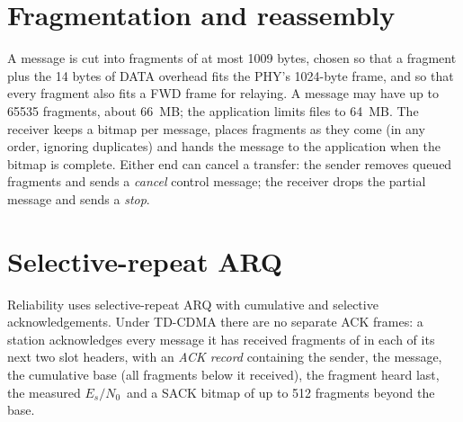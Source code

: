 \documentclass[11pt,a4paper,oneside]{report}
\newcommand{\EsNo}{\ensuremath{E_s/N_0}}
\begin{document}
\section{Fragmentation and reassembly}\label{sec:frag}
A message is cut into fragments of at most \num{1009} bytes, chosen so that a fragment plus the 14
bytes of DATA overhead fits the PHY's \num{1024}-byte frame, and so that every fragment also fits a FWD
frame for relaying. A message may have up to \num{65535} fragments, about \SI{66}{MB}; the application
limits files to \SI{64}{MB}. The receiver keeps a bitmap per message, places fragments as they come
(in any order, ignoring duplicates) and hands the message to the application when the bitmap is
complete. Either end can cancel a transfer: the sender removes queued fragments and sends a
\emph{cancel} control message; the receiver drops the partial message and sends a \emph{stop}.

\section{Selective-repeat ARQ}\label{sec:arq}
Reliability uses selective-repeat ARQ with cumulative and selective acknowledgements. Under TD-CDMA
there are no separate ACK frames: a station acknowledges every message it has received fragments of
in each of its next two slot headers, with an \emph{ACK record} containing the sender, the message,
the cumulative base (all fragments below it received), the fragment heard last, the measured \EsNo\
and a SACK bitmap of up to 512 fragments beyond the base.
\end{document}
